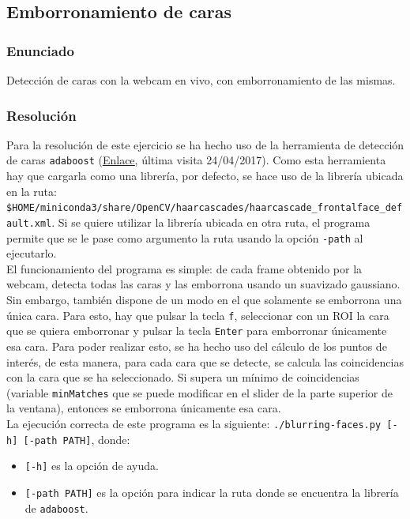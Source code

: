 \documentclass[a4paper,10pt,titlepage,oneside,openright]{book}
\begin{document}
\medskip
\subsection{Emborronamiento de caras}

\subsubsection*{Enunciado}
Detección de caras con la webcam en vivo, con emborronamiento de las mismas.

\subsubsection*{Resolución}
Para la resolución de este ejercicio se ha hecho uso de la herramienta de detección de caras \texttt{adaboost} (\href{https://en.wikipedia.org/wiki/Viola\%E2\%80\%93Jones\_object\_detection\_framework}{\color{blue}\underline{Enlace}}, última visita 24/04/2017). Como esta herramienta hay que cargarla como una librería, por defecto, se hace uso de la librería ubicada en la ruta: \texttt{\$HOME/miniconda3/share/OpenCV/haarcascades/haarcascade\_frontalface\_default.xml}. Si se quiere utilizar la librería ubicada en otra ruta, el programa permite que se le pase como argumento la ruta usando la opción \texttt{-path} al ejecutarlo. \\

El funcionamiento del programa es simple: de cada frame obtenido por la webcam, detecta todas las caras y las emborrona usando un suavizado gaussiano. Sin embargo, también dispone de un modo en el que solamente se emborrona una única cara. Para esto, hay que pulsar la tecla \texttt{f}, seleccionar con un ROI la cara que se quiera emborronar y pulsar la tecla \texttt{Enter} para emborronar únicamente esa cara. Para poder realizar esto, se ha hecho uso del cálculo de los puntos de interés, de esta manera, para cada cara que se detecte, se calcula las coincidencias con la cara que se ha seleccionado. Si supera un mínimo de coincidencias (variable \texttt{minMatches} que se puede modificar en el slider de la parte superior de la ventana), entonces se emborrona únicamente esa cara. \\

La ejecución correcta de este programa es la siguiente: \texttt{./blurring-faces.py [-h] [-path PATH]}, donde:
\begin{itemize}
 \item \texttt{[-h]} es la opción de ayuda.
 \item \texttt{[-path PATH]} es la opción para indicar la ruta donde se encuentra la librería de \texttt{adaboost}.
\end{itemize}
\end{document}
